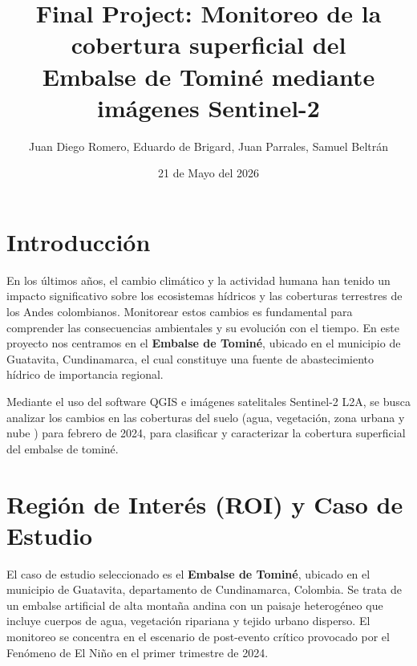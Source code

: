 \documentclass[12pt, letterpaper]{article}
\begin{document}

\title{\textbf{Final Project: Monitoreo de la cobertura superficial del\\
Embalse de Tomin\'e mediante im\'agenes Sentinel-2}}
\author{
  Juan Diego Romero, Eduardo de Brigard, Juan Parrales, Samuel Beltrán
}
\date{21 de Mayo del 2026}
\maketitle

\section{Introducci\'on}

En los \'ultimos a\~nos, el cambio clim\'atico y la actividad humana han tenido un impacto
significativo sobre los ecosistemas h\'idricos y las coberturas terrestres de los Andes
colombianos. Monitorear estos cambios es fundamental para comprender las consecuencias
ambientales y su evoluci\'on con el tiempo. En este proyecto nos centramos en el
\textbf{Embalse de Tomin\'e}, ubicado en el municipio de Guatavita, Cundinamarca, el cual
constituye una fuente de abastecimiento h\'idrico de importancia regional.

Mediante el uso del software QGIS e im\'agenes satelitales Sentinel-2 L2A, se busca analizar
los cambios en las coberturas del suelo (agua, vegetaci\'on, zona urbana y nube ) para febrero de 2024, para clasificar y caracterizar la cobertura superficial del embalse de tomin\'e.

\section{Regi\'on de Inter\'es (ROI) y Caso de Estudio}

El caso de estudio seleccionado es el \textbf{Embalse de Tomin\'e}, ubicado en el municipio de Guatavita, departamento de Cundinamarca, Colombia. Se trata de un embalse artificial de alta monta\~na andina con un paisaje heterog\'eneo que incluye cuerpos de agua, vegetaci\'on ripariana y tejido urbano disperso. El monitoreo se concentra en el escenario de post-evento cr\'itico provocado por el Fen\'omeno de El Ni\~no en el primer trimestre de 2024.
\end{document}
